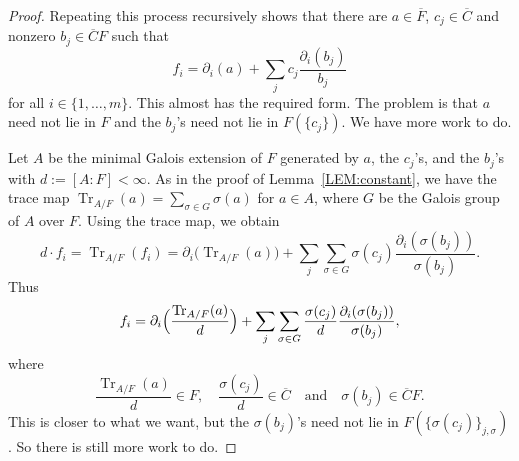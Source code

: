 \documentclass{amsart}
\theoremstyle{definition}
\numberwithin{equation}{section}
\numberwithin{thm}{section}
\begin{document}
\begin{proof}
Repeating this process recursively shows that there are $a \in \overline{F}$, $c_j \in \overline{C}$ and nonzero $b_j\in \overline{C}F$ such that
\[
f_i = \partial_i(a) + \sum_{j} c_j \frac{\partial_i (b_j)}{b_j}
\]
for all $i \in \{1,\dots,m\}$.  This almost has the required form. The problem is that $a$ need not lie in $F$ and the $b_j$'s need not lie in $F(\{c_j\})$.  We have more work to do.
	
Let $A$ be the minimal Galois extension of $F$ generated by $a$, the $c_{j}$'s, and the $b_{j}$'s with $d := [A : F] < \infty$.   As in the proof of Lemma~\ref{LEM:constant}, we have the trace map  $\operatorname{Tr}_{A/F}(a) = \sum_{\sigma \in G} \sigma(a)$ for $a\in A$, where $G$ be the Galois group of $A$ over $F$.  Using the trace map, we obtain
\[
d \cdot f_i=\operatorname{Tr}_{A/F}(f_i) = \partial_i\bigl( \operatorname{Tr}_{A/F}(a)\bigr) + \sum_j \sum_{\sigma\in G} \sigma(c_j) \frac{\partial_i(\sigma(b_j))}{\sigma(b_j)}.
\]
Thus
\[
f_i = \partial_i\Bigl(\frac{\operatorname{Tr}_{A/F}(a)}{d}\Bigr) + \sum_j \sum_{\sigma\in G} \dfrac{\sigma(c_j)}{d} \frac{\partial_i(\sigma(b_j))}{\sigma(b_j)},	
\]
where
\[
\frac{\operatorname{Tr}_{A/F}(a)}{d} \in F, \quad \dfrac{\sigma(c_j)}{d} \in \overline{C} \quad \text{and} \quad  \sigma(b_j) \in \overline{C}F.
\]
This is closer to what we want, but the  $\sigma(b_j)$'s need not lie in $F(\{\sigma(c_j)\}_{j,\sigma})$.  So there is still more work to do.
	

\end{proof}
\end{document}
